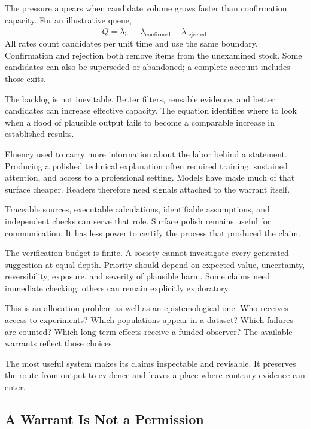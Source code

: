 The pressure appears when candidate volume grows faster than confirmation capacity. For an illustrative queue,
\begin{equation}
 \dot Q=\lambda_{\mathrm{in}}
        -\lambda_{\mathrm{confirmed}}
        -\lambda_{\mathrm{rejected}}.
\end{equation}
All rates count candidates per unit time and use the same boundary. Confirmation and rejection both remove items from the unexamined stock. Some candidates can also be superseded or abandoned; a complete account includes those exits.

The backlog is not inevitable. Better filters, reusable evidence, and better candidates can increase effective capacity. The equation identifies where to look when a flood of plausible output fails to become a comparable increase in established results.

Fluency used to carry more information about the labor behind a statement. Producing a polished technical explanation often required training, sustained attention, and access to a professional setting. Models have made much of that surface cheaper. Readers therefore need signals attached to the warrant itself.

Traceable sources, executable calculations, identifiable assumptions, and independent checks can serve that role. Surface polish remains useful for communication. It has less power to certify the process that produced the claim.

The verification budget is finite. A society cannot investigate every generated suggestion at equal depth. Priority should depend on expected value, uncertainty, reversibility, exposure, and severity of plausible harm. Some claims need immediate checking; others can remain explicitly exploratory.

This is an allocation problem as well as an epistemological one. Who receives access to experiments? Which populations appear in a dataset? Which failures are counted? Which long-term effects receive a funded observer? The available warrants reflect those choices.

The most useful system makes its claims inspectable and revisable. It preserves the route from output to evidence and leaves a place where contrary evidence can enter.

\subsection{A Warrant Is Not a Permission}

